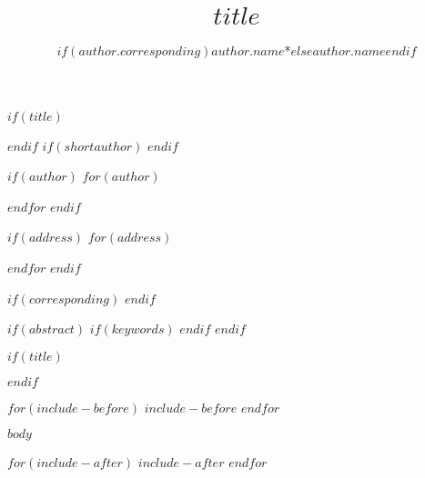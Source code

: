 \documentclass[AMS,STIX1COL]{WileyNJD-v2}
\begin{document}
$if(title)$
\title{$title$}
$endif$  
$if(shortauthor)$
$endif$ 

$if(author)$
$for(author)$
\author[$author.numaddress$]{$if(author.corresponding)$$author.name$*$else$$author.name$$endif$}
$endfor$
$endif$

$if(address)$
$for(address)$
\address[$address.numaddress$]{
, , }
$endfor$
$endif$

$if(corresponding)$
$endif$

$if(abstract)$
$if(keywords)$ 
$endif$
$endif$



$if(title)$
\maketitle
$endif$

$for(include-before)$
$include-before$
$endfor$

$body$

$for(include-after)$
$include-after$
$endfor$

%
\end{document}
